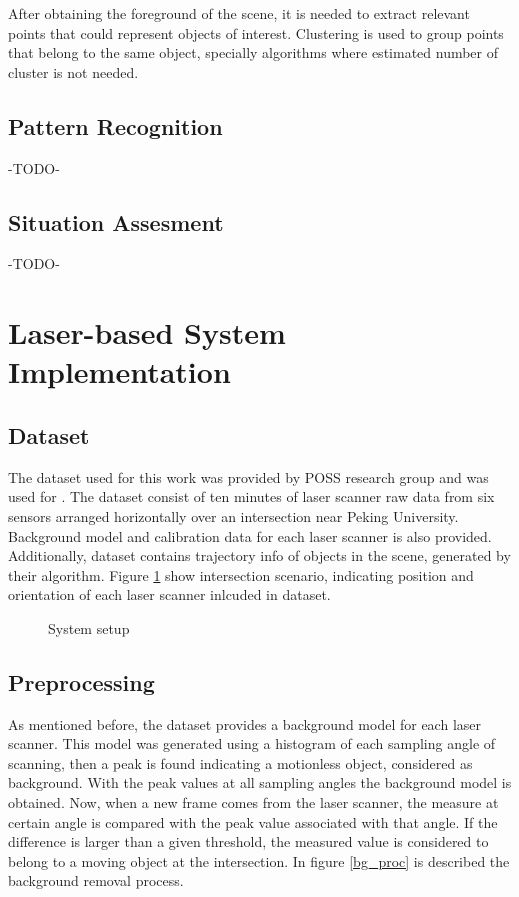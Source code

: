 \documentclass[10pt,twocolumn,letterpaper]{article}
\begin{document}
After obtaining the foreground of the scene, it is needed to extract relevant points that could represent objects of interest. Clustering is used to group points that belong to the same object, specially algorithms where estimated number of cluster is not needed. 


\subsection{Pattern Recognition}

-TODO-

\subsection{Situation Assesment}

-TODO-

\section{Laser-based System Implementation}

\subsection{Dataset}
 The dataset used for this work was provided by POSS research group and was used for \cite{Zhao2009}. The dataset consist of ten minutes of laser scanner raw data from six sensors arranged horizontally over an intersection near Peking University. Background model and calibration data for each laser scanner is also provided. Additionally, dataset contains trajectory info of objects in the scene, generated by their algorithm. Figure \ref{inter_cfg} show intersection scenario, indicating position and orientation of each laser scanner inlcuded in dataset.
 
\begin{figure}[ht!]
\centering


\caption{System setup}
\label{inter_cfg}
\end{figure}
 
\subsection{Preprocessing}

As mentioned before, the dataset provides a background model for each laser scanner. This model was generated using a histogram of each sampling angle of scanning, then a peak is found indicating a motionless object, considered as background. With the peak values at all sampling angles the background model is obtained. Now, when a new frame comes from the laser scanner, the measure at certain angle is compared with the peak value associated with that angle. If the difference is larger than a given threshold, the measured value is considered to belong to a moving object at the intersection. In figure \ref{bg_proc} is described the background removal process.
\end{document}
